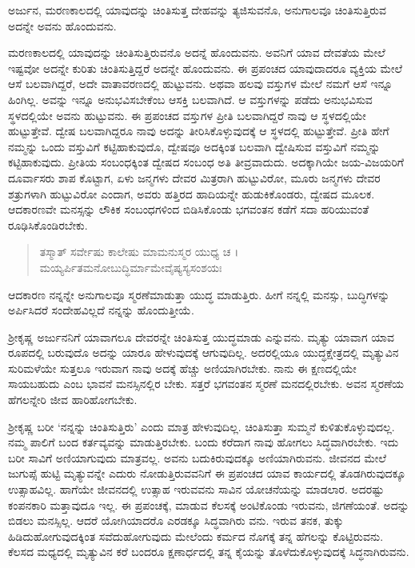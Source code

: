 {\small ಅರ್ಜುನ, ಮರಣಕಾಲದಲ್ಲಿ ಯಾವುದನ್ನು ಚಿಂತಿಸುತ್ತ ದೇಹವನ್ನು ತ್ಯಜಿಸುವನೊ, ಅನುಗಾಲವೂ ಚಿಂತಿಸುತ್ತಿರುವ ಅದನ್ನೇ ಅವನು ಹೊಂದುವನು.}

ಮರಣಕಾಲದಲ್ಲಿ ಯಾವುದನ್ನು ಚಿಂತಿಸುತ್ತಿರುವನೊ ಅದನ್ನೆ ಹೊಂದುವನು. ಅವನಿಗೆ ಯಾವ ದೇವತೆಯ ಮೇಲೆ ಇಷ್ಟವೋ ಅದನ್ನೇ ಕುರಿತು ಚಿಂತಿಸುತ್ತಿದ್ದರೆ ಅದನ್ನೇ ಹೊಂದುವನು. ಈ ಪ್ರಪಂಚದ ಯಾವುದಾದರೂ ವ್ಯಕ್ತಿಯ ಮೇಲೆ ಆಸೆ ಬಲವಾಗಿದ್ದರೆ, ಅದೇ ವಾತಾವರಣದಲ್ಲಿ ಹುಟ್ಟುವನು. ಅಥವಾ ಹಲವು ವಸ್ತುಗಳ ಮೇಲೆ ನಮಗೆ ಆಸೆ ಇನ್ನೂ ಹಿಂಗಿಲ್ಲ. ಅವನ್ನು ಇನ್ನೂ ಅನುಭವಿಸಬೇಕೆಂಬ ಆಸಕ್ತಿ ಬಲವಾಗಿದೆ. ಆ ವಸ್ತುಗಳನ್ನು ಪಡೆದು ಅನುಭವಿಸುವ ಸ್ಥಳದಲ್ಲಿಯೇ ಅವನು ಹುಟ್ಟುವನು. ಈ ಪ್ರಪಂಚದ ವಸ್ತುಗಳ ಪ್ರೀತಿ ಬಲವಾಗಿದ್ದರೆ ನಾವು ಆ ಸ್ಥಳದಲ್ಲಿಯೇ ಹುಟ್ಟುತ್ತೇವೆ. ದ್ವೇಷ ಬಲವಾಗಿದ್ದರೂ ನಾವು ಅದನ್ನು ತೀರಿಸಿಕೊಳ್ಳುವುದಕ್ಕೆ ಆ ಸ್ಥಳದಲ್ಲಿ ಹುಟ್ಟುತ್ತೇವೆ. ಪ್ರೀತಿ ಹೇಗೆ ನಮ್ಮನ್ನು ಒಂದು ವಸ್ತುವಿಗೆ ಕಟ್ಟಿಹಾಕುವುದೊ, ದ್ವೇಷವೂ ಅದಕ್ಕಿಂತ ಬಲವಾಗಿ ದ್ವೇಷಿಸುವ ವಸ್ತುವಿಗೆ ನಮ್ಮನ್ನು ಕಟ್ಟಿಹಾಕುವುದು. ಪ್ರೀತಿಯ ಸಂಬಂಧಕ್ಕಿಂತ ದ್ವೇಷದ ಸಂಬಂಧ ಅತಿ ತೀವ್ರವಾದುದು. ಅದಕ್ಕಾಗಿಯೇ ಜಯ-ವಿಜಯರಿಗೆ ದೂರ್ವಾಸರು ಶಾಪ ಕೊಟ್ಟಾಗ, ಏಳು ಜನ್ಮಗಳು ದೇವರ ಮಿತ್ರರಾಗಿ ಹುಟ್ಟುವಿರೋ, ಮೂರು ಜನ್ಮಗಳು ದೇವರ ಶತ್ರುಗಳಾಗಿ ಹುಟ್ಟುವಿರೋ ಎಂದಾಗ, ಅವರು ಹತ್ತಿರದ ಹಾದಿಯನ್ನೇ ಹುಡುಕಿಕೊಂಡರು, ದ್ವೇಷದ ಮೂಲಕ. ಆದಕಾರಣವೇ ಮನಸ್ಸನ್ನು ಲೌಕಿಕ ಸಂಬಂಧಗಳಿಂದ ಬಿಡಿಸಿಕೊಂಡು ಭಗವಂತನ ಕಡೆಗೆ ಸದಾ ಹರಿಯುವಂತೆ ರೂಢಿಸಿಕೊಂಡಿರಬೇಕು.

\begin{verse}
ತಸ್ಮಾತ್ ಸರ್ವೇಷು ಕಾಲೇಷು ಮಾಮನುಸ್ಮರ ಯುಧ್ಯ ಚ ।\\ಮಯ್ಯರ್ಪಿತಮನೋಬುದ್ಧಿರ್ಮಾಮೇವೈಷ್ಯಸ್ಯಸಂಶಯಃ 
\end{verse}

{\small ಆದಕಾರಣ ನನ್ನನ್ನೇ ಅನುಗಾಲವೂ ಸ್ಮರಣೆಮಾಡುತ್ತಾ ಯುದ್ಧ ಮಾಡುತ್ತಿರು. ಹೀಗೆ ನನ್ನಲ್ಲಿ ಮನಸ್ಸು, ಬುದ್ಧಿಗಳನ್ನು ಅರ್ಪಿಸಿದರೆ ಸಂದೇಹವಿಲ್ಲದೆ ನನ್ನನ್ನು ಹೊಂದುತ್ತೀಯೆ.}

ಶ್ರೀಕೃಷ್ಣ ಅರ್ಜುನನಿಗೆ ಯಾವಾಗಲೂ ದೇವರನ್ನೇ ಚಿಂತಿಸುತ್ತ ಯುದ್ಧಮಾಡು ಎನ್ನುವನು. ಮೃತ್ಯು ಯಾವಾಗ ಯಾವ ರೂಪದಲ್ಲಿ ಬರುವುದೊ ಅದನ್ನು ಯಾರೂ ಹೇಳುವುದಕ್ಕೆ ಆಗುವುದಿಲ್ಲ. ಅದರಲ್ಲಿಯೂ ಯುದ್ಧಕ್ಷೇತ್ರದಲ್ಲಿ ಮೃತ್ಯುವಿನ ಸುರಿಮಳೆಯೇ ಸುತ್ತಲೂ ಇರುವಾಗ ನಾವು ಅದಕ್ಕೆ ಹೆಚ್ಚು ಅಣಿಯಾಗಿರಬೇಕು. ನಾನು ಈ ಕ್ಷಣದಲ್ಲಿಯೇ ಸಾಯಬಹುದು ಎಂಬ ಭಾವನೆ ಮನಸ್ಸಿನಲ್ಲಿರ ಬೇಕು. ಸತ್ತರೆ ಭಗವಂತನ ಸ್ಮರಣೆ ಮನದಲ್ಲಿರಬೇಕು. ಅವನ ಸ್ಮರಣೆಯ ಹೆಗಲನ್ನೇರಿ ಜೀವ ಹಾರಿಹೋಗಬೇಕು.

ಶ್ರೀಕೃಷ್ಣ ಬರೀ ‘ನನ್ನನ್ನು ಚಿಂತಿಸುತ್ತಿರು’ ಎಂದು ಮಾತ್ರ ಹೇಳುವುದಿಲ್ಲ. ಚಿಂತಿಸುತ್ತಾ ಸುಮ್ಮನೆ ಕುಳಿತುಕೊಳ್ಳುವುದಲ್ಲ. ನಮ್ಮ ಪಾಲಿಗೆ ಬಂದ ಕರ್ತವ್ಯವನ್ನು ಮಾಡುತ್ತಿರಬೇಕು. ಬಂದು ಕರೆದಾಗ ನಾವು ಹೋಗಲು ಸಿದ್ಧವಾಗಿರಬೇಕು. ಇದು ಬರೀ ಸಾವಿಗೆ ಅಣಿಯಾಗುವುದು ಮಾತ್ರವಲ್ಲ. ಅವನು ಬದುಕಿರುವುದಕ್ಕೂ ಅಣಿಯಾಗಿರುವನು. ಜೀವನದ ಮೇಲೆ ಜುಗುಪ್ಸೆ ಹುಟ್ಟಿ ಮೃತ್ಯುವನ್ನೇ ಎದುರು ನೋಡುತ್ತಿರುವವನಿಗೆ ಈ ಪ್ರಪಂಚದ ಯಾವ ಕಾರ್ಯದಲ್ಲಿ ತೊಡಗಿರುವುದಕ್ಕೂ ಉತ್ಸಾಹವಿಲ್ಲ. ಹಾಗೆಯೇ ಜೀವನದಲ್ಲಿ ಉತ್ಸಾಹ ಇರುವವನು ಸಾವಿನ ಯೋಚನೆಯನ್ನು ಮಾಡಲಾರ. ಅದರಷ್ಟು ಕಂಪನಕಾರಿ ಮತ್ತಾವುದೂ ಇಲ್ಲ. ಈ ಪ್ರಪಂಚಕ್ಕೆ, ಮಾಡುವ ಕೆಲಸಕ್ಕೆ ಅಂಟಿಕೊಂಡು ಇರುವನು, ಜಿಗಣೆಯಂತೆ. ಅದನ್ನು ಬಿಡಲು ಮನಸ್ಸಿಲ್ಲ. ಆದರೆ ಯೋಗಿಯಾದರೊ ಎರಡಕ್ಕೂ ಸಿದ್ಧವಾಗಿರು ವನು. ಇರುವ ತನಕ, ತುಕ್ಕು ಹಿಡಿದುಹೋಗುವುದಕ್ಕಿಂತ ಸವೆದುಹೋಗುವುದು ಮೇಲೆಂದು ಕರ್ಮದ ನೊಗಕ್ಕೆ ತನ್ನ ಹೆಗಲನ್ನು ಕೊಟ್ಟಿರುವನು. ಕೆಲಸದ ಮಧ್ಯದಲ್ಲಿ ಮೃತ್ಯುವಿನ ಕರೆ ಬಂದರೂ ಕ್ಷಣಾರ್ಧದಲ್ಲಿ ತನ್ನ ಕೈಯನ್ನು ತೊಳೆದುಕೊಳ್ಳುವುದಕ್ಕೆ ಸಿದ್ಧನಾಗಿರುವನು.

